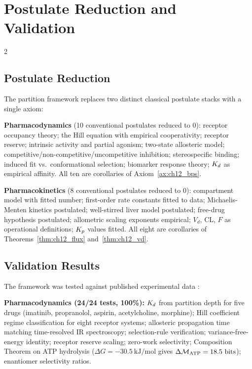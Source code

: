 \section{Postulate Reduction and Validation}
\label{sec:ch12_validation}

\begin{multicols}{2}

\subsection{Postulate Reduction}

The partition framework replaces two distinct classical postulate stacks with a single axiom:

\textbf{Pharmacodynamics} (10 conventional postulates reduced to 0): receptor occupancy theory; the Hill equation with empirical cooperativity; receptor reserve; intrinsic activity and partial agonism; two-state allosteric model; competitive/non-competitive/uncompetitive inhibition; stereospecific binding; induced fit vs.\ conformational selection; biomarker response theory; $K_d$ as empirical affinity. All ten are corollaries of Axiom~\ref{ax:ch12_bps}.

\textbf{Pharmacokinetics} (8 conventional postulates reduced to 0): compartment model with fitted number; first-order rate constants fitted to data; Michaelis-Menten kinetics postulated; well-stirred liver model postulated; free-drug hypothesis postulated; allometric scaling exponents empirical; $V_d$, CL, $F$ as operational definitions; $K_p$ values fitted. All eight are corollaries of Theorems~\ref{thm:ch12_flux} and~\ref{thm:ch12_vd}.

\subsection{Validation Results}

The framework was tested against published experimental data \citep{goodman_gilman,rowland_tozer_2011}:

\textbf{Pharmacodynamics (24/24 tests, 100\%):} $K_d$ from partition depth for five drugs (imatinib, propranolol, aspirin, acetylcholine, morphine); Hill coefficient regime classification for eight receptor systems; allosteric propagation time matching time-resolved IR spectroscopy; selection-rule verification; variance-free-energy identity; receptor reserve scaling; zero-work selectivity; Composition Theorem on ATP hydrolysis ($\Delta G = -30.5\ \mathrm{kJ/mol}$ gives $\DeltaDepth_{\mathrm{ATP}} = 18.5\ \mathrm{bits}$); enantiomer selectivity ratios.


\end{multicols}

